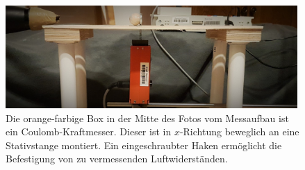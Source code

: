 \begin{figure}[htbp]
\centering
 \includegraphics[width=0.99\textwidth]{images/stroemungskraftmessung3.jpg}
  \caption[Coulomb-Kraftmesser der Firma LD Didactic]{Die orange-farbige Box in der Mitte des Fotos vom Messaufbau ist ein Coulomb-Kraftmesser. Dieser ist in $x$-Richtung beweglich an eine Stativstange montiert. Ein eingeschraubter Haken ermöglicht die Befestigung von zu vermessenden Luftwiderständen.}
    \label{fig:stroemungskraftmessung3}
  \vspace{-0pt}
\end{figure}